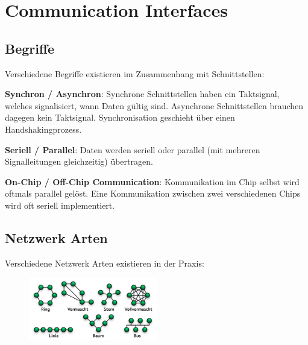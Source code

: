 \section{Communication Interfaces}
\subsection{Begriffe}
Verschiedene Begriffe existieren im Zusammenhang mit Schnittstellen:
\begin{compactitem}
    \item \textbf{Synchron / Asynchron}: Synchrone Schnittstellen haben ein Taktsignal, welches signalisiert, wann Daten gültig sind. Asynchrone Schnittstellen brauchen dagegen kein Taktsignal. Synchronisation geschieht über einen Handshakingprozess.
    \item \textbf{Seriell / Parallel}: Daten werden seriell oder parallel (mit mehreren Signalleitungen gleichzeitig) übertragen.
    \item \textbf{On-Chip / Off-Chip Communication}: Kommunikation im Chip selbst wird oftmals parallel gelöst. Eine Kommunikation zwischen zwei verschiedenen Chips wird oft seriell implementiert.
\end{compactitem}

\subsection{Netzwerk Arten}
Verschiedene Netzwerk Arten existieren in der Praxis:
\begin{figure}[H]
    \includegraphics[width=0.5\textwidth]{images/netzwerkarten.png}
\end{figure}

